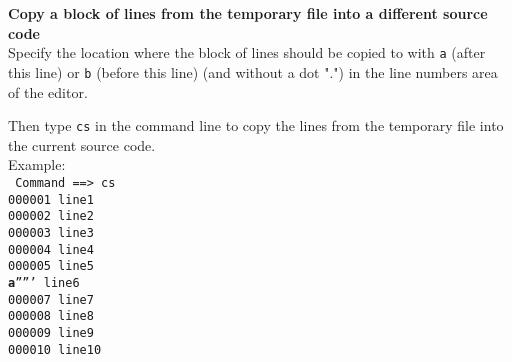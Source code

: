 \documentclass{report}
\begin{document}
\textbf{Copy a block of lines from the temporary file into a different source code} \\

Specify the location where the block of lines should be copied to with
\texttt{a} (after this line) or \texttt{b} (before this line) (and without
a dot ".") in the line numbers area of the editor.

Then type \texttt{cs} in the command line to copy the lines from the temporary
file into the current source code. \\

Example: \\

\texttt{
Command ==> cs \\
000001 line1 \\
000002 line2 \\
000003 line3 \\
000004 line4 \\
000005 line5 \\
\textbf{a}''''' line6 \\
000007 line7 \\
000008 line8 \\
000009 line9 \\
000010 line10 \\
}
\end{document}
